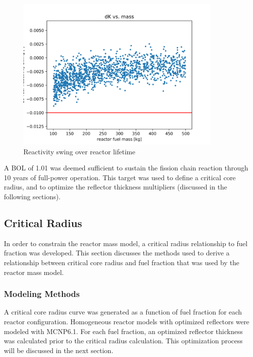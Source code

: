 \begin{figure}[h]
    \centering
    \includegraphics[width=4in]{../images/dK_vs_mass.png}
\caption{Reactivity swing over reactor lifetime}
\label{fig:delta_k_eol}
\end{figure}

A BOL \keff of 1.01 was deemed sufficient to sustain the fission chain reaction
through 10 years of full-power operation. This \keff target was used to define a
critical core radius, and to optimize the reflector thickness multipliers
(discussed in the following sections).

\subsection{Critical Radius}
In order to constrain the reactor mass model, a critical radius relationship to
fuel fraction was developed. This section discusses the methods used to derive a
relationship between critical core radius and fuel fraction that was used by the
reactor mass model. 

\subsubsection{Modeling Methods}
A critical core radius curve was generated as a function of fuel fraction for
each reactor configuration. Homogeneous reactor models with optimized reflectors
were modeled with MCNP6.1. For each fuel fraction, an optimized reflector
thickness was calculated prior to the critical radius calculation. This
optimization process will be discussed in the next section.


